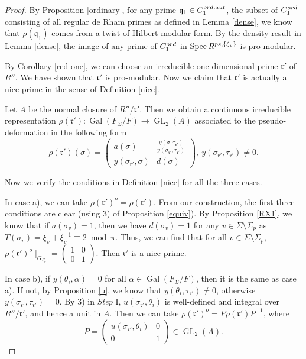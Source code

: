 \documentclass[10pt,a4paper]{amsart}
\begin{document}
	\begin{proof}
		By Proposition \ref{ordinary}, for any prime $\mathfrak{q}_1 \in  C_1^{\textnormal{ord,aut}}$, the subset of $C_1^{\textnormal{ord}} $ consisting of all regular de Rham primes as defined in Lemma \ref{dense}, we know that $\rho(\mathfrak{q}_1)$ comes from a twist of Hilbert modular form. By the density result in Lemma \ref{dense}, the image of any prime of $C_1^{\textnormal{ord}}$ in $\operatorname{Spec} R^{\textnormal{ps},\{\xi_v\}}$ is pro-modular.  
		
		By Corollary \ref{red-one}, we can choose an irreducible one-dimensional prime $\mathfrak{r}'$ of $R''$. We have shown that $\mathfrak{r}' $ is pro-modular. Now we claim that $\mathfrak{r}' $ is actually a nice prime in the sense of Definition \ref{nice}.
		
		Let $A$ be the normal closure of $R''/\mathfrak{r}'$. Then we obtain a continuous irreducible representation $\rho(\mathfrak{r}') : \operatorname{Gal}(F_{\Sigma}/F) \to \operatorname{GL}_2(A)$ associated to the pseudo-deformation in the following form $$
		\rho(\mathfrak{r}')(\sigma)=\begin{pmatrix}
			a(\sigma) & \frac{y(\sigma, \tau_{\mathfrak{r}'})}{y(\sigma_{\mathfrak{r}'}, \tau_{\mathfrak{r}'})}\\
			y(\sigma_{\mathfrak{r}'}, \sigma)& d(\sigma)
	\end{pmatrix}, ~y(\sigma_{\mathfrak{r}'}, \tau_{\mathfrak{r}'}) \ne 0.$$
		
		Now we verify the conditions in Definition \ref{nice} for all the three cases. 
		
		In case a), we can take $\rho(\mathfrak{r}')^o=\rho(\mathfrak{r}')$. From our construction, the first three conditions are clear (using 3) of Proposition \ref{equiv}). By Proposition \ref{RX1}, we know that if $a(\sigma_{v})=1$, then we have $d(\sigma_{v})=1$ for any $v \in \Sigma \setminus \Sigma_p$ as $T(\sigma_{v})=\xi_v+\xi_v^{-1} \equiv 2~ \operatorname{mod}~\pi$. Thus, we can find that for all $v \in \Sigma \setminus \Sigma_p$, $\rho(\mathfrak{r}')^o \mid_{G_{F_v}}= \begin{pmatrix}
			1 & 0\\
			0 & 1
		\end{pmatrix}$. Then $\mathfrak{r}' $ is a nice prime.
		
		In case b), if $y(\theta_{i}, \alpha)=0$ for all $\alpha \in \operatorname{Gal}(F_\Sigma/F)$, then it is the same as case a). If not, by Proposition \ref{u}, we know that $y(\theta_{i}, \tau_{\mathfrak{r}'}) \ne  0$, otherwise $y(\sigma_{\mathfrak{r}'}, \tau_{\mathfrak{r}'}) = 0$. By 3) in \textit{Step} I, $u(\sigma_{\mathfrak{r}'}, \theta_{i})$ is well-defined and integral over $R''/\mathfrak{r}'$, and hence a unit in $A$. Then we can take $\rho(\mathfrak{r}')^o=P\rho(\mathfrak{r}')P^{-1}$, where $$P= \begin{pmatrix}
			u(\sigma_{\mathfrak{r}'}, \theta_{i}) & 0\\
			0 & 1
		\end{pmatrix} \in \operatorname{GL}_2(A).$$
		

\end{proof}
\end{document}
